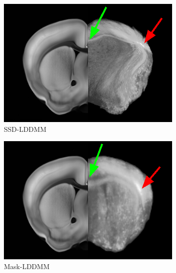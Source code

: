 \documentclass[simplex.tex]{subfiles}
\begin{document}
\begin{figure}[!h]
\begin{cframed}
\centering
 \begin{subfigure}{0.25\columnwidth}
  \includegraphics[width=\textwidth]{../../figs/ssdCoronal.png}  
  \caption{SSD-LDDMM}
  \label{fig:clarityCoronalSSD}
 \end{subfigure}
 \begin{subfigure}{0.25\columnwidth}
  \includegraphics[width=\textwidth]{../../figs/maskCoronal.png}  
  \caption{Mask-LDDMM}
  \label{fig:clarityCoronalMask}
 \end{subfigure}
 \begin{subfigure}{0.25\columnwidth}

\end{subfigure}
\end{cframed}
\end{figure}
\end{document}
